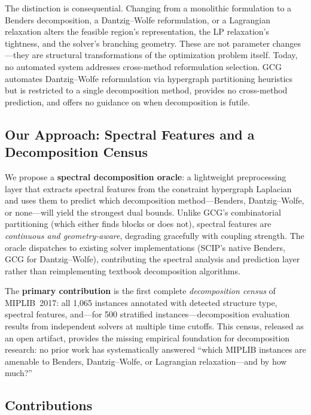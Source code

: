 \documentclass[12pt]{article}
\begin{document}
The distinction is consequential.  Changing from a monolithic formulation to
a Benders decomposition, a Dantzig--Wolfe reformulation, or a Lagrangian
relaxation alters the feasible region's representation, the LP relaxation's
tightness, and the solver's branching geometry.  These are not parameter
changes---they are structural transformations of the optimization problem
itself.  Today, no automated system addresses cross-method reformulation
selection.  GCG \citep{gamrath2010generic,gamrath2023gcg} automates
Dantzig--Wolfe reformulation via hypergraph partitioning heuristics but is
restricted to a single decomposition method, provides no cross-method
prediction, and offers no guidance on when decomposition is futile.

\subsection{Our Approach: Spectral Features and a Decomposition Census}

We propose a \textbf{spectral decomposition oracle}: a lightweight
preprocessing layer that extracts spectral features from the constraint
hypergraph Laplacian and uses them to predict which decomposition
method---Benders, Dantzig--Wolfe, or none---will yield the strongest dual
bounds.  Unlike GCG's combinatorial partitioning (which either finds blocks
or does not), spectral features are \emph{continuous and geometry-aware},
degrading gracefully with coupling strength.  The oracle dispatches to
existing solver implementations (SCIP's native Benders, GCG for
Dantzig--Wolfe), contributing the spectral analysis and prediction layer
rather than reimplementing textbook decomposition algorithms.

The \textbf{primary contribution} is the first complete \emph{decomposition
census} of MIPLIB~2017: all 1,065 instances annotated with detected
structure type, spectral features, and---for 500 stratified
instances---decomposition evaluation results from independent solvers at
multiple time cutoffs.  This census, released as an open artifact, provides
the missing empirical foundation for decomposition research: no prior work
has systematically answered ``which MIPLIB instances are amenable to
Benders, Dantzig--Wolfe, or Lagrangian relaxation---and by how much?''

\subsection{Contributions}
\end{document}
